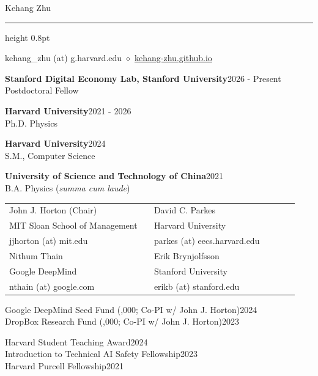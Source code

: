 \documentclass[10pt]{article}
\DeclareRobustCommand{\$}{\char36\relax}  %
\newenvironment{rSection}[1]{%
  \par\addvspace{10pt}%
  \begin{list}{}{%
    \setlength{\leftmargin}{1.4in}\setlength{\labelwidth}{1.3in}%
    \setlength{\labelsep}{0.1in}\setlength{\itemsep}{0pt}%
    \setlength{\topsep}{0pt}\setlength{\parsep}{7pt}%
    \renewcommand{\makelabel}[1]{\smash{\parbox[t]{\labelwidth}{\raggedright\scshape ##1}}}}%
  \item[#1]}{\end{list}}
\newcommand{\entry}[3]{{\bfseries #1}\hspace{1em}\hfill #2\\#3\par}
\newcommand{\dline}[2]{#1\hfill #2\\}
\begin{document}
{\LARGE Kehang Zhu}\par\vspace{4pt}
\hrule height 0.8pt\relax

\begin{rSection}{Contact}
kehang\_zhu (at) g.harvard.edu $\diamond$ \href{https://kehang-zhu.github.io/}{kehang-zhu.github.io}
\end{rSection}

\begin{rSection}{Appointments}
\entry{Stanford Digital Economy Lab, Stanford University}{2026 - Present}{Postdoctoral Fellow}
\end{rSection}

\begin{rSection}{Education}
\entry{Harvard University}{2021 - 2026}{Ph.D. Physics}
\entry{Harvard University}{2024}{S.M., Computer Science}
\entry{University of Science and Technology of China}{2021}{B.A. Physics (\textit{summa cum laude})}
\end{rSection}

\begin{rSection}{References}
\begin{tabular}[t]{@{}p{0.47\linewidth}@{}p{0.47\linewidth}@{}}
John J. Horton (Chair)        & David C. Parkes \\
MIT Sloan School of Management & Harvard University \\
jjhorton (at) mit.edu          & parkes (at) eecs.harvard.edu \\[8pt]
Nithum Thain                   & Erik Brynjolfsson \\
Google DeepMind                & Stanford University \\
nthain (at) google.com         & erikb (at) stanford.edu \\
\end{tabular}
\end{rSection}

\begin{rSection}{Grants\\(\$150,000)}
\dline{Google DeepMind Seed Fund (\$50,000; Co-PI w/ John J. Horton)}{2024}
\dline{DropBox Research Fund (\$100,000; Co-PI w/ John J. Horton)}{2023}
\end{rSection}

\begin{rSection}{Awards \&\\Scholarships}
\dline{Harvard Student Teaching Award}{2024}
\dline{Introduction to Technical AI Safety Fellowship}{2023}
\dline{Harvard Purcell Fellowship}{2021}
\end{rSection}
\end{document}

